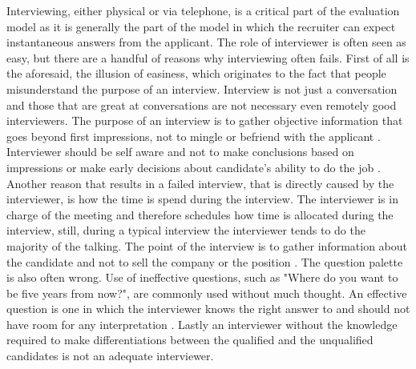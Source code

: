 \documentclass[11pt,a4paper,oneside,article]{memoir}
\begin{document}
Interviewing, either physical or via telephone, is a critical part of the evaluation model as it is generally the part of the model in which the recruiter can expect instantaneous answers from the applicant. The role of interviewer is often seen as easy, but there are a handful of reasons why interviewing often fails. First of all is the aforesaid, the illusion of easiness, which originates to the fact that people misunderstand the purpose of an interview. Interview is not just a conversation and those that are great at conversations are not necessary even remotely good interviewers. The purpose of an interview is to gather objective information that goes beyond first impressions, not to mingle or befriend with the applicant \cite[p.~6]{camp:book}. Interviewer should be self aware and not to make conclusions based on impressions or make early decisions about candidate's ability to do the job \cite[p.~5-7]{camp:book}. Another reason that results in a failed interview, that is directly caused by the interviewer, is how the time is spend during the interview. The interviewer is in charge of the meeting and therefore schedules how time is allocated during the interview, still, during a typical interview the interviewer tends to do the majority of the talking. The point of the interview is to gather information about the candidate and not to sell the company or the position \cite[p.~9]{camp:book}. The question palette is also often wrong. Use of ineffective questions, such as "Where do you want to be five years from now?", are commonly used without much thought. An effective question is one in which the interviewer knows the right answer to and should not have room for any interpretation \cite[p.~10]{camp:book}. Lastly an interviewer without the knowledge required to make differentiations between the qualified and the unqualified candidates is not an adequate interviewer. \cite[p.~5-11]{camp:book}

\end{document}
